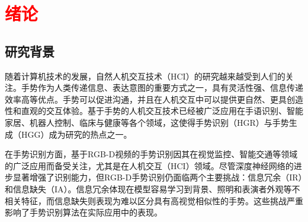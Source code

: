 
\chapter{\textcolor{red}{绪论}}
\label{sec:intro}

\section{研究背景}
随着计算机技术的发展，自然人机交互技术（HCI）的研究越来越受到人们的关注。手势作为人类传递信息、表达意图的重要方式之一，具有灵活性强、信息传递效率高等优点\cite{guo2021human}。手势可以促进沟通，并且在人机交互中可以提供更自然、更具创造性和直观的交互体验\cite{oudah2020hand}。基于手势的人机交互技术已经被广泛应用在手语识别\cite{伍杰2019基于视觉的实时手势识别方法研究}、智能家居\cite{desai2017human}、机器人控制\cite{al20223d}、临床与健康\cite{strickland2013using}等各个领域，这使得手势识别（HGR）与手势生成（HGG）成为研究的热点之一。

在手势识别方面，基于RGB-D视频的手势识别因其在视觉监控、智能交通等领域的广泛应用而备受关注，尤其是在人机交互（HCI）\cite{yu2021searching}领域。尽管深度神经网络的进步显著增强了识别能力，但RGB-D手势识别仍面临两个主要挑战：信息冗余（IR）和信息缺失（IA）。信息冗余体现在模型容易学习到背景、照明和表演者外观等不相关特征，而信息缺失则表现为难以区分具有高视觉相似性的手势。这些挑战严重影响了手势识别算法在实际应用中的表现。


